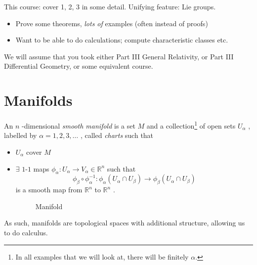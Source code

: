 This course: cover 1, 2, 3 in some detail. Unifying feature: Lie groups.
\begin{itemize}
  \item Prove some theorems, \emph{lots of} examples (often instead of proofs)
  \item Want to be able to do calculations; compute characteristic classes etc.
\end{itemize}
We will assume that you took either Part III General Relativity, or Part III Differential Geometry, or some equivalent course. 

\chapter{Manifolds}%
\label{cha:manifolds}

\begin{definition}[manifold]
  An $n$ -dimensional \emph{smooth manifold} is a set $M$  and a collection\footnote{In all examples that we will look at, there will be finitely $\alpha$.} of open sets $U_{\alpha}$ , labelled by $\alpha = 1, 2, 3, \dots$ , called \emph{charts} such that
  \begin{itemize}
    \item $U_{\alpha}$  cover $M$
     \item $\exists$  $1$-$1$ maps  $\phi_{\alpha} \colon U_{\alpha} \to V_{\alpha} \in \mathbb{R}^n$  such that
      \begin{equation}
	\phi_{\beta} \circ \phi_{\alpha}^{-1} \colon \phi_{\alpha}(U_{\alpha} \cap U_{\beta}) \to \phi_{\beta}(U_{\alpha} \cap U_{\beta})
      \end{equation}
      is a smooth map from $\mathbb{R}^n$  to $\mathbb{R}^n$ .
      \begin{figure}[tbhp]
        \centering
        \def\svgwidth{0.4\columnwidth}
        
        \caption{Manifold}
        \label{fig:manifold}
      \end{figure}
  \end{itemize}
\end{definition}

As such, manifolds are topological spaces with additional structure, allowing us to do calculus.

